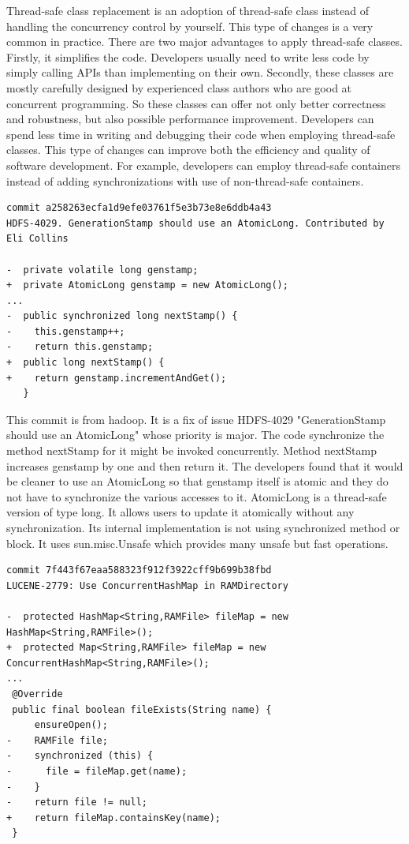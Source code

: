 Thread-safe class replacement is an adoption of thread-safe class instead of handling the concurrency control by yourself. This type of changes is a very common in practice. There are two major advantages to apply thread-safe classes. Firstly, it simplifies the code. Developers usually need to write less code by simply calling APIs than implementing on their own. Secondly, these classes are mostly carefully designed by experienced class authors who are good at concurrent programming. So these classes can offer not only better correctness and robustness, but also possible performance improvement. Developers can spend less time in writing and debugging their code when employing thread-safe classes. This type of changes can improve both the efficiency and quality of software development. For example, developers can employ thread-safe containers instead of adding synchronizations with use of non-thread-safe containers.

\begin{lstlisting}
commit a258263ecfa1d9efe03761f5e3b73e8e6ddb4a43
HDFS-4029. GenerationStamp should use an AtomicLong. Contributed by Eli Collins

-  private volatile long genstamp;
+  private AtomicLong genstamp = new AtomicLong();
...
-  public synchronized long nextStamp() {
-    this.genstamp++;
-    return this.genstamp;
+  public long nextStamp() {
+    return genstamp.incrementAndGet();
   }
\end{lstlisting}

This commit is from hadoop. It is a fix of issue HDFS-4029 "GenerationStamp should use an AtomicLong" whose priority is major. The code synchronize the method nextStamp for it might be invoked concurrently. Method nextStamp increases genstamp by one and then return it. The developers found that it would be cleaner to use an AtomicLong so that genstamp itself is atomic and they do not have to synchronize the various accesses to it. AtomicLong is a thread-safe version of type long. It allows users to update it atomically without any synchronization. Its internal implementation is not using synchronized method or block. It uses sun.misc.Unsafe which provides many unsafe but fast operations.

\begin{lstlisting}
commit 7f443f67eaa588323f912f3922cff9b699b38fbd
LUCENE-2779: Use ConcurrentHashMap in RAMDirectory

-  protected HashMap<String,RAMFile> fileMap = new HashMap<String,RAMFile>();
+  protected Map<String,RAMFile> fileMap = new ConcurrentHashMap<String,RAMFile>();
...
 @Override
 public final boolean fileExists(String name) {
     ensureOpen();
-    RAMFile file;
-    synchronized (this) {
-      file = fileMap.get(name);
-    }
-    return file != null;
+    return fileMap.containsKey(name);
 }
\end{lstlisting}

